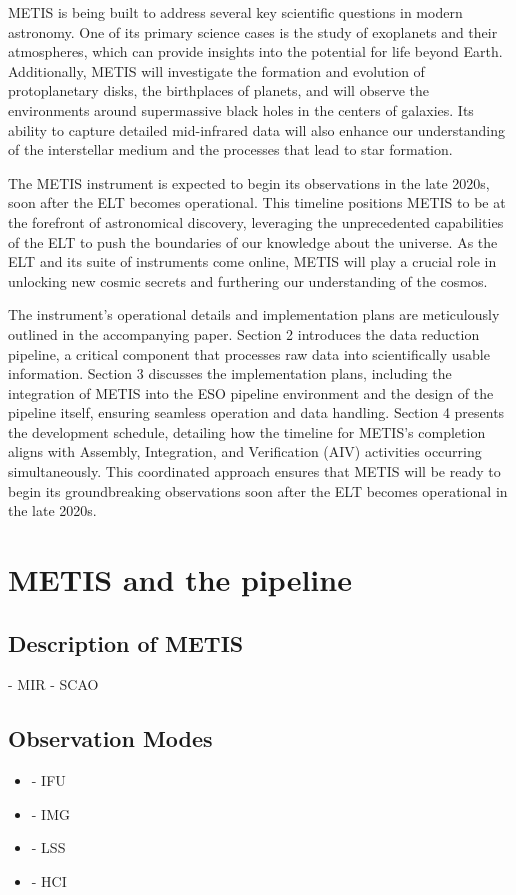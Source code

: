 \documentclass[a4paper]{spie}  %
\begin{document}
METIS is being built to address several key scientific questions in modern astronomy. One of its primary science cases is the study of exoplanets and their atmospheres, which can provide insights into the potential for life beyond Earth. Additionally, METIS will investigate the formation and evolution of protoplanetary disks, the birthplaces of planets, and will observe the environments around supermassive black holes in the centers of galaxies. Its ability to capture detailed mid-infrared data will also enhance our understanding of the interstellar medium and the processes that lead to star formation.

The METIS instrument is expected to begin its observations in the late 2020s, soon after the ELT becomes operational. This timeline positions METIS to be at the forefront of astronomical discovery, leveraging the unprecedented capabilities of the ELT to push the boundaries of our knowledge about the universe. As the ELT and its suite of instruments come online, METIS will play a crucial role in unlocking new cosmic secrets and furthering our understanding of the cosmos.

The instrument's operational details and implementation plans are meticulously outlined in the accompanying paper. Section 2 introduces the data reduction pipeline, a critical component that processes raw data into scientifically usable information. Section 3 discusses the implementation plans, including the integration of METIS into the ESO pipeline environment and the design of the pipeline itself, ensuring seamless operation and data handling. Section 4 presents the development schedule, detailing how the timeline for METIS's completion aligns with Assembly, Integration, and Verification (AIV) activities occurring simultaneously. This coordinated approach ensures that METIS will be ready to begin its groundbreaking observations soon after the ELT becomes operational in the late 2020s. 



\section{METIS and the pipeline}
\label{sec:environment}

\subsection{Description of METIS}
\label{ssec:env_metis}
	- MIR
	- SCAO
\subsection{Observation Modes}
\label{ssec:env_modes}
 \begin{itemize}
     \item - IFU
     \item - IMG
     \item - LSS
     \item - HCI
 \end{itemize}
 
\end{document}
